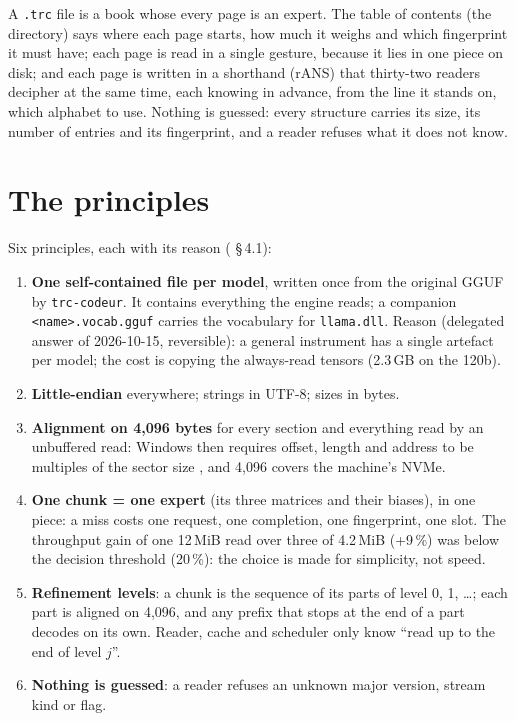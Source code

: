 \begin{enbref}
A \texttt{.trc} file is a book whose every page is an expert. The table of contents (the directory) says where each page starts, how much it weighs and which fingerprint it must have; each page is read in a single gesture, because it lies in one piece on disk; and each page is written in a shorthand (rANS) that thirty-two readers decipher at the same time, each knowing in advance, from the line it stands on, which alphabet to use. Nothing is guessed: every structure carries its size, its number of entries and its fingerprint, and a reader refuses what it does not know.
\end{enbref}

\section{The principles}\label{t2fmt:sec:principes}

Six principles, each with its reason ( §\,4.1):
\begin{enumerate}
\item \textbf{One self-contained file per model}, written once from the original GGUF by \texttt{trc-codeur}. It contains everything the engine reads; a companion \texttt{<name>.vocab.gguf} carries the vocabulary for \texttt{llama.dll}. Reason (delegated answer of 2026-10-15, reversible): a general instrument has a single artefact per model; the cost is copying the always-read tensors (2.3\,GB on the 120b).
\item \textbf{Little-endian} everywhere; strings in UTF-8; sizes in bytes.
\item \textbf{Alignment on 4{,}096 bytes} for every section and everything read by an unbuffered read: Windows then requires offset, length and address to be multiples of the sector size \cite{microsoft2025filebuffering}, and 4{,}096 covers the machine's NVMe.
\item \textbf{One chunk = one expert} (its three matrices and their biases), in one piece: a miss costs one request, one completion, one fingerprint, one slot. The throughput gain of one 12\,MiB read over three of 4.2\,MiB (+9\,\%) was below the decision threshold (20\,\%): the choice is made for simplicity, not speed.
\item \textbf{Refinement levels}: a chunk is the sequence of its parts of level 0, 1, …; each part is aligned on 4{,}096, and any prefix that stops at the end of a part decodes on its own. Reader, cache and scheduler only know ``read up to the end of level $j$''.
\item \textbf{Nothing is guessed}: a reader refuses an unknown major version, stream kind or flag.
\end{enumerate}

